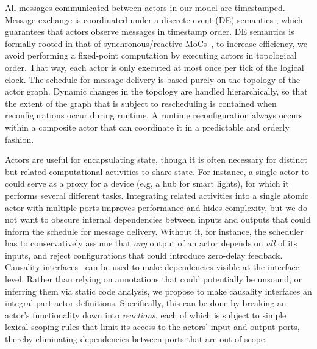 \documentclass[sigconf]{acmart}
\newcommand{\marten}[1]{\mynote{Marten}{#1}{cyan}}%
\begin{document}
All messages communicated between actors in our model are timestamped. Message exchange is coordinated under a discrete-event (DE) semantics \cite{LeeEtAl:7:DiscreteEvents}, which guarantees that actors observe messages in timestamp order.
DE semantics is formally rooted in that of synchronous/reactive MoCs~\cite{LeeZheng:07:SRDECT}, to increase efficiency, we avoid performing a fixed-point computation by executing actors in topological order. That way, each actor is only executed at most once per tick of the logical clock. The schedule for message delivery is based purely on the topology of the actor graph.
Dynamic changes in the topology are handled hierarchically, so that the extent of the graph that is subject to rescheduling is contained when reconfigurations occur during runtime. A runtime reconfiguration always occurs within a composite actor that can coordinate it in a predictable and orderly fashion. %

Actors are useful for encapsulating state, though it is often necessary for distinct but related computational activities to share state. For instance, a single actor to could serve as a proxy for a device (e.g, a hub for smart lights), for which it performs several different tasks.
Integrating related activities into a single atomic actor with multiple ports improves performance and hides complexity, but we do not want to obscure internal dependencies between inputs and outputs that could inform the schedule for message delivery. Without it, for instance, the scheduler has to conservatively assume that \emph{any} output of an actor depends on \emph{all} of its inputs, and reject configurations that could introduce zero-delay feedback. Causality interfaces~\cite{ZhouLee:08:CausalityInterfaces} can be used to make dependencies visible at the interface level. Rather than relying on annotations that could potentially be unsound, or inferring them via static code analysis, we propose to make causality interfaces an integral part actor definitions. Specifically, this can be done by breaking an actor's functionality down into \emph{reactions}, each of which is subject to simple lexical scoping rules that limit its access to the actors' input and output ports, thereby eliminating dependencies between ports that are out of scope.
\end{document}

